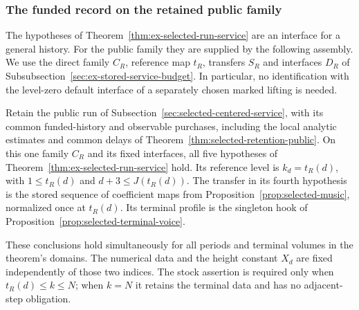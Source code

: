\subsubsection{The funded record on the retained public family}
\label{sec:ex-c02-selected-attachment}

The hypotheses of Theorem~\ref{thm:ex-selected-run-service} are an
interface for a general history. For the public family they are supplied
by the following assembly. We use the direct family $C_R$, reference
map $t_R$, transfers $S_R$ and interfaces $D_R$ of
Subsubsection~\ref{sec:ex-stored-service-budget}. In particular, no identification
with the level-zero default interface of a separately chosen marked lifting is needed.

\begin{proposition}
\label{prop:ex-c02-selected-record}
Retain the public run of Subsection~\ref{sec:selected-centered-service},
with its common funded-history and observable purchases, including the
local analytic estimates and common delays of
Theorem~\ref{thm:selected-retention-public}. On this one family $C_R$
and its fixed interfaces, all five hypotheses of
Theorem~\ref{thm:ex-selected-run-service} hold. Its reference level is
$k_d=t_R(d)$, with $1\le t_R(d)$ and $d+3\le J(t_R(d))$.
The transfer in its fourth hypothesis is the stored sequence of coefficient maps
from Proposition~\ref{prop:selected-music}, normalized once at $t_R(d)$.
Its terminal profile is the singleton hook of
Proposition~\ref{prop:selected-terminal-voice}.

These conclusions hold simultaneously for all periods and terminal
volumes in the theorem's domains. The numerical data and the height
constant $X_d$ are fixed independently of those two indices. The stock
assertion is required only when $t_R(d)\le k\le N$; when $k=N$ it retains
the terminal data and has no adjacent-step obligation.
\end{proposition}

